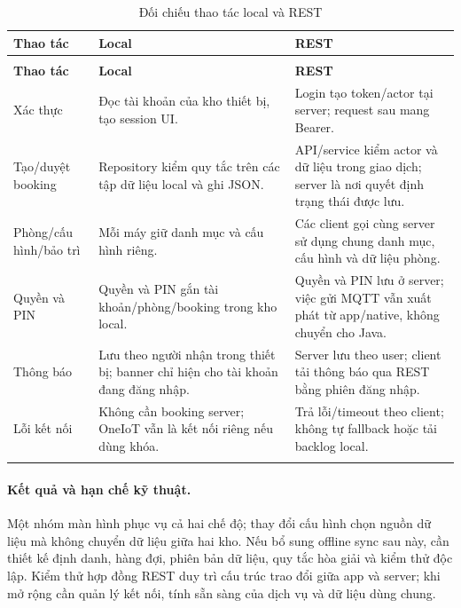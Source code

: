 {\tabletext\renewcommand{\arraystretch}{1.04}\begin{longtable}{>{\raggedright\arraybackslash}p{}>{\raggedright\arraybackslash}p{}>{\raggedright\arraybackslash}p{}}
\caption{Đối chiếu thao tác local và REST}\label{tab:local-remote}\\
\toprule \textbf{Thao tác} & \textbf{Local} & \textbf{REST}\\\midrule
\endfirsthead
\multicolumn{3}{l}{\small Đối chiếu thao tác local và REST (tiếp)}\\
\toprule \textbf{Thao tác} & \textbf{Local} & \textbf{REST}\\\midrule
\endhead
\bottomrule\endlastfoot
Xác thực & Đọc tài khoản của kho thiết bị, tạo session UI. & Login tạo token/actor tại server; request sau mang Bearer.\\\addlinespace[1.5pt]
Tạo/duyệt booking & Repository kiểm quy tắc trên các tập dữ liệu local và ghi JSON. & API/service kiểm actor và dữ liệu trong giao dịch; server là nơi quyết định trạng thái được lưu.\\\addlinespace[1.5pt]
Phòng/cấu hình/bảo trì & Mỗi máy giữ danh mục và cấu hình riêng. & Các client gọi cùng server sử dụng chung danh mục, cấu hình và dữ liệu phòng.\\\addlinespace[1.5pt]
Quyền và PIN & Quyền và PIN gắn tài khoản/phòng/booking trong kho local. & Quyền và PIN lưu ở server; việc gửi MQTT vẫn xuất phát từ app/native, không chuyển cho Java.\\\addlinespace[1.5pt]
Thông báo & Lưu theo người nhận trong thiết bị; banner chỉ hiện cho tài khoản đang đăng nhập. & Server lưu theo user; client tải thông báo qua REST bằng phiên đăng nhập.\\\addlinespace[1.5pt]
Lỗi kết nối & Không cần booking server; OneIoT vẫn là kết nối riêng nếu dùng khóa. & Trả lỗi/timeout theo client; không tự fallback hoặc tải backlog local.\\\addlinespace[1.5pt]
\end{longtable}}

\paragraph{Kết quả và hạn chế kỹ thuật.} Một nhóm màn hình phục vụ cả hai chế độ; thay đổi cấu hình chọn nguồn dữ liệu mà không chuyển dữ liệu giữa hai kho. Nếu bổ sung offline sync sau này, cần thiết kế định danh, hàng đợi, phiên bản dữ liệu, quy tắc hòa giải và kiểm thử độc lập. Kiểm thử hợp đồng REST duy trì cấu trúc trao đổi giữa app và server; khi mở rộng cần quản lý kết nối, tính sẵn sàng của dịch vụ và dữ liệu dùng chung.
